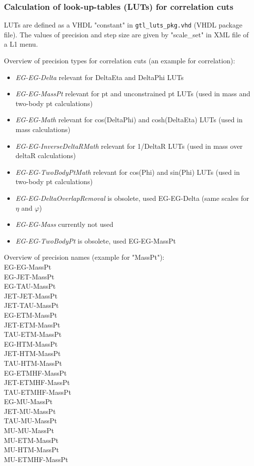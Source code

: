 \clearpage

\subsubsection{Calculation of look-up-tables (LUTs) for correlation cuts}
\label{sec:gtl:calc_luts_corr_cuts}

LUTs are defined as a VHDL "constant" in \texttt{gtl\_luts\_pkg.vhd} (VHDL package file).
The values of precision and step size are given by "scale\_set" in XML file of a L1 menu.

Overview of precision types for correlation cuts (an example for \eg \eg correlation):
\begin{itemize}
\item \textit{EG-EG-Delta} relevant for DeltaEta and DeltaPhi LUTs
\item \textit{EG-EG-MassPt} relevant for pt and unconstrained pt LUTs (used in mass and two-body pt calculations)
\item \textit{EG-EG-Math} relevant for cos(DeltaPhi) and cosh(DeltaEta) LUTs (used in mass calculations)
\item \textit{EG-EG-InverseDeltaRMath} relevant for 1/DeltaR LUTs (used in mass over deltaR calculations)
\item \textit{EG-EG-TwoBodyPtMath} relevant for cos(Phi) and sin(Phi) LUTs (used in two-body pt calculations)
\item \textit{EG-EG-DeltaOverlapRemoval} is obsolete, used EG-EG-Delta (same scales for $\eta$ and $\varphi$)
\item \textit{EG-EG-Mass} currently not used
\item \textit{EG-EG-TwoBodyPt} is obsolete, used EG-EG-MassPt
\end{itemize}

Overview of precision names (example for "MassPt"):\\
EG-EG-MassPt\\
EG-JET-MassPt\\
EG-TAU-MassPt\\
JET-JET-MassPt\\
JET-TAU-MassPt\\
EG-ETM-MassPt\\
JET-ETM-MassPt\\
TAU-ETM-MassPt\\
EG-HTM-MassPt\\
JET-HTM-MassPt\\
TAU-HTM-MassPt\\
EG-ETMHF-MassPt\\
JET-ETMHF-MassPt\\
TAU-ETMHF-MassPt\\
EG-MU-MassPt\\
JET-MU-MassPt\\
TAU-MU-MassPt\\
MU-MU-MassPt\\
MU-ETM-MassPt\\
MU-HTM-MassPt\\
MU-ETMHF-MassPt\\

